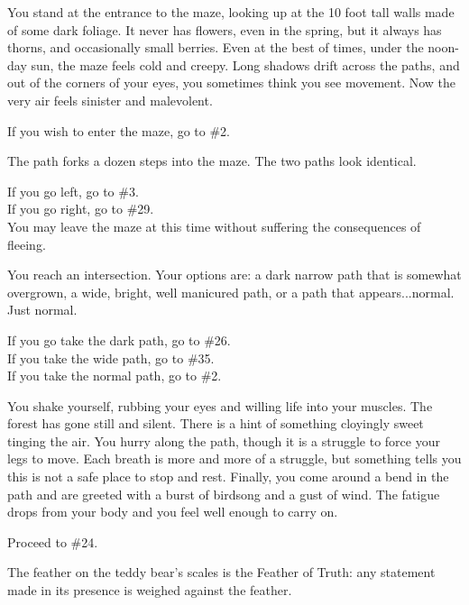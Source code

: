 \documentclass[green]{gl2018}
\begin{document}
\begin{large}
\begin{location}{1}
You stand at the entrance to the maze, looking up at the 10 foot tall walls made of some dark foliage. It never has flowers, even in the spring, but it always has thorns, and occasionally small berries. Even at the best of times, under the noon-day sun, the maze feels cold and creepy. Long shadows drift across the paths, and out of the corners of your eyes, you sometimes think you see movement. Now the very air feels sinister and malevolent. 

\begin{fromhere}If you wish to enter the maze, go to \#2.\end{fromhere}
\end{location}
\begin{location}{2}
The path forks a dozen steps into the maze. The two paths look identical.  
\begin{fromhere}
If you go left, go to \#3. \\
If you go right, go to \#29.\\
You may leave the maze at this time without suffering the consequences of fleeing.
\end{fromhere}
\end{location}
\begin{location}{3}
You reach an intersection. Your options are: a dark narrow path that is somewhat overgrown, a wide, bright, well manicured path, or a path that appears...normal.  Just normal.

\begin{fromhere}
 If you go take the dark path, go to \#26.\\
 If you take the wide path, go to \#35.\\
 If you take the normal path, go to \#2.
\end{fromhere}
\end{location}
\begin{location}{4}
You shake yourself, rubbing your eyes and willing life into your muscles.  The forest has gone still and silent.  There is a hint of something cloyingly sweet tinging the air.  You hurry along the path, though it is a struggle to force your legs to move.  Each breath is more and more of a struggle, but something tells you this is not a safe place to stop and rest.  Finally,  you come around a bend in the path and are greeted with a burst of birdsong and a gust of wind.  The fatigue drops from your body and you feel well enough to carry on.  
\begin{fromhere}
Proceed to \#24.
\end{fromhere}
\end{location}
\begin{location}{5}
The feather on the teddy bear's scales is the Feather of Truth: any statement made in its presence is weighed against the feather.  


\end{location}
\end{large}
\end{document}
